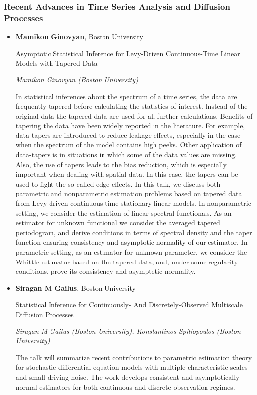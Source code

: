 \subsubsection*{Recent Advances in Time Series Analysis and Diffusion Processes}

\begin{itemize}
\item \textbf{Mamikon Ginovyan}, Boston University

Asymptotic Statistical Inference for Levy-Driven Continuous-Time Linear Models with Tapered Data

\emph{\footnotesize Mamikon Ginovyan (Boston University)}

In statistical inferences about the spectrum of a time series, the data are frequently tapered before calculating the statistics of interest. Instead of the original data the tapered data are used for all further calculations. Benefits of tapering the data have been widely reported in the literature. For example, data-tapers are introduced to reduce leakage effects, especially in the case when the spectrum of the model contains high peeks. Other application of data-tapers is in situations in which some of the data values are missing. Also, the use of tapers leads to the bias reduction, which is especially important when dealing with spatial data. In this case, the tapers can be used to fight the so-called edge effects. In this talk, we discuss both parametric and nonparametric estimation problems based on tapered data from Levy-driven continuous-time stationary linear models. In nonparametric setting, we consider the estimation of linear spectral functionals. As an estimator for unknown functional we consider the averaged tapered periodogram, and derive conditions in terms of spectral density and the taper function ensuring consistency and asymptotic normality of our estimator. In parametric setting, as an estimator for unknown parameter, we consider the Whittle estimator based on the tapered data, and, under some regularity conditions, prove its consistency and asymptotic normality.

\item \textbf{Siragan M Gailus}, Boston University

Statistical Inference for Continuously- And Discretely-Observed Multiscale Diffusion Processes

\emph{\footnotesize Siragan M Gailus (Boston University), Konstantinos Spiliopoulos (Boston University)}

The talk will summarize recent contributions to parametric estimation theory for stochastic differential equation models with multiple characteristic scales and small driving noise. The work develops consistent and asymptotically normal estimators for both continuous and discrete observation regimes.


\end{itemize}

